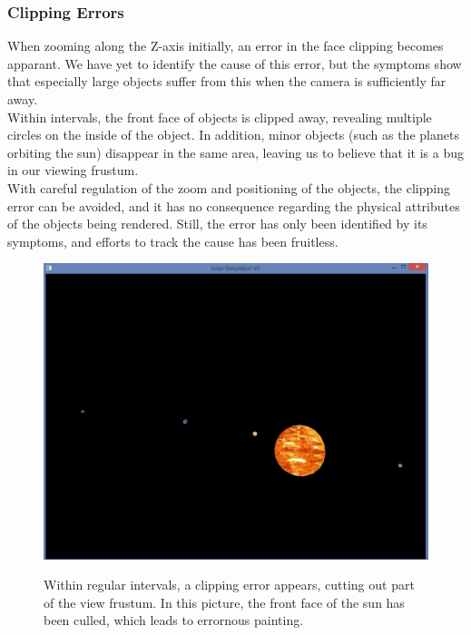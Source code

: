 \subsubsection{Clipping Errors}
When zooming along the Z-axis initially, an error in the face clipping becomes apparant. We have yet to identify the cause of this error, but the symptoms show that especially large objects suffer from this when the camera is sufficiently far away.\\
Within intervals, the front face of objects is clipped away, revealing multiple circles on the inside of the object. In addition, minor objects (such as the planets orbiting the sun) disappear in the same area, leaving us to believe that it is a bug in our viewing frustum.\\
With careful regulation of the zoom and positioning of the objects, the clipping error can be avoided, and it has no consequence regarding the physical attributes of the objects being rendered. Still, the error has only been identified by its symptoms, and efforts to track the cause has been fruitless.
\begin{figure}
	\centering
	\includegraphics[scale=0.3]{Pictures/Bugs/ClippingError}
	\label{ClippingError}
	\caption{Within regular intervals, a clipping error appears, cutting out part of the view frustum. In this picture, the front face of the sun has been culled, which leads to errornous painting.}
\end{figure}